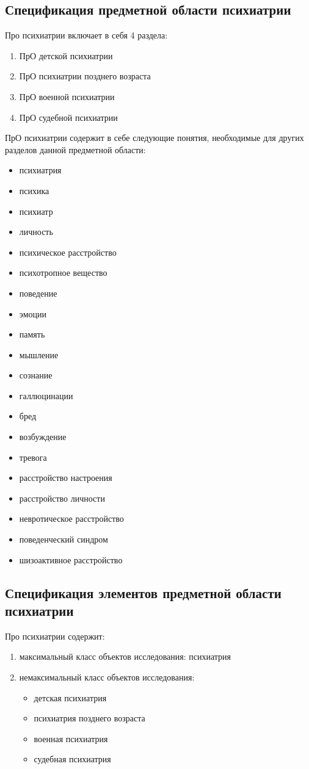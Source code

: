\subsection{Спецификация предметной области психиатрии}
Про психиатрии включает в себя 4 раздела:
\begin{enumerate}
	\item ПрО детской психиатрии
	\item ПрО психиатрии позднего возраста
	\item ПрО военной психиатрии 
	\item ПрО судебной психиатрии\\
\end{enumerate}

ПрО психиатрии содержит в себе следующие понятия, необходимые для других разделов данной предметной области:
\begin{itemize}
	\item психиатрия
	\item психика
	\item психиатр 
	\item личность
	\item психическое расстройство
	\item психотропное вещество
	\item поведение
	\item эмоции
	\item память 
	\item мышление
	\item сознание
	\item галлюцинации
	\item бред
	\item возбуждение
	\item тревога 
	\item расстройство настроения
	\item расстройство личности
	\item невротическое расстройство
	\item поведенческий синдром
	\item шизоактивное расстройство\\
\end{itemize}

\subsection{Спецификация элементов предметной области психиатрии}
Про психиатрии содержит:
\begin{enumerate}
	\item максимальный класс объектов исследования: психиатрия
	\item немаксимальный класс объектов исследования: \begin{itemize}
		\item детская психиатрия
		\item психиатрия позднего возраста
		\item военная психиатрия 
		\item судебная психиатрия\\
	\end{itemize}
\end{enumerate}


